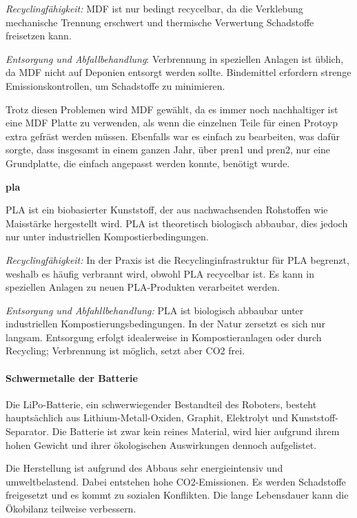 \textit{Recyclingfähigkeit:}  MDF ist nur bedingt recycelbar, da die Verklebung mechanische Trennung erschwert und thermische Verwertung Schadstoffe freisetzen kann.\cite{support-2024}

\textit{Entsorgung und Abfallbehandlung}: Verbrennung in speziellen Anlagen ist üblich, da MDF
nicht auf Deponien entsorgt werden sollte. Bindemittel erfordern strenge Emissionskontrollen, um Schadstoffe zu minimieren.\cite{mdf-entsorgung}

Trotz diesen Problemen wird MDF gewählt, da es immer noch nachhaltiger ist eine MDF Platte zu verwenden, als wenn die einzelnen Teile für einen Protoyp extra gefräst werden müssen. Ebenfalls war es einfach zu bearbeiten, was dafür sorgte, dass insgesamt in einem ganzen Jahr, über \acrshort{pren1} und \acrshort{pren2}, nur eine Grundplatte, die einfach angepasst werden konnte, benötigt wurde.
 
\textbf{\acrfull{pla}}

PLA ist ein biobasierter Kunststoff, der aus nachwachsenden Rohstoffen wie Maisstärke hergestellt wird. PLA ist theoretisch biologisch abbaubar, dies jedoch nur unter industriellen Kompostierbedingungen.

\textit{Recyclingfähigkeit:} In der Praxis ist die Recyclinginfrastruktur für PLA begrenzt, weshalb es häufig verbrannt wird, obwohl PLA recycelbar ist.
Es kann in speziellen Anlagen zu neuen PLA-Produkten verarbeitet werden. \cite{pla-recycling}

\textit{Entsorgung und Abfahllbehandlung:} PLA ist biologisch abbaubar unter industriellen Kompostierungsbedingungen. In der Natur zersetzt es sich nur langsam. Entsorgung erfolgt
idealerweise in Kompostieranlagen oder durch Recycling; Verbrennung ist möglich, setzt
aber CO2 frei.\cite{pla-details}


\paragraph{Schwermetalle der Batterie}

Die LiPo-Batterie, ein schwerwiegender Bestandteil des Roboters, besteht hauptsächlich aus Lithium-Metall-Oxiden, Graphit, Elektrolyt und Kunststoff-Separator. Die Batterie ist zwar kein reines Material, wird hier aufgrund ihrem hohen Gewicht und ihrer ökologischen Auswirkungen dennoch aufgelistet.\cite{litio-akkus}

Die Herstellung ist aufgrund des Abbaus sehr energieintensiv und umweltbelastend. Dabei entstehen hohe CO2-Emissionen. Es werden Schadstoffe freigesetzt und es kommt zu sozialen Konflikten. Die lange Lebensdauer kann die Ökobilanz teilweise verbessern.\cite{tezgoren}

